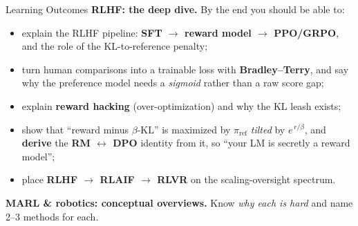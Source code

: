 \begin{frame}{Learning Outcomes}
\textbf{RLHF: the deep dive.} By the end you should be able to:
\begin{itemize}\itemsep0.2em\small
    \item explain the RLHF pipeline: \textbf{SFT $\rightarrow$ reward model
          $\rightarrow$ PPO/GRPO}, and the role of the KL-to-reference penalty;
    \item turn human comparisons into a trainable loss with \textbf{Bradley--Terry},
          and say why the preference model needs a \emph{sigmoid} rather than a raw
          score gap;
    \item explain \textbf{reward hacking} (over-optimization) and why the KL leash
          exists;
    \item show that ``reward minus $\beta$-KL'' is maximized by $\pi_{\text{ref}}$
          \emph{tilted} by $e^{\,r/\beta}$, and \textbf{derive} the
          \textbf{RM $\leftrightarrow$ DPO} identity from it, so ``your LM is
          secretly a reward model'';
    \item place \textbf{RLHF $\rightarrow$ RLAIF $\rightarrow$ RLVR} on the
          scaling-oversight spectrum.
\end{itemize}
\vspace{0.5em}
\textbf{MARL \& robotics: conceptual overviews.} Know \emph{why each is hard}
and name 2--3 methods for each.
\end{frame}
